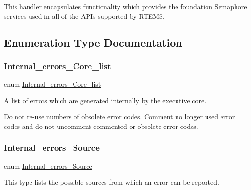 This handler encapsulates functionality which provides the foundation Semaphore services used in all of the A\+P\+Is supported by R\+T\+E\+MS. 

\subsection{Enumeration Type Documentation}
\mbox{\label{group__RTEMSScoreIntErr_ga55d1197d1b88e797ec344be41aa4f5fe}} 
\subsubsection{\texorpdfstring{Internal\_errors\_Core\_list}{Internal\_errors\_Core\_list}}
{\footnotesize\ttfamily enum \mbox{\hyperlink{group__RTEMSScoreIntErr_ga55d1197d1b88e797ec344be41aa4f5fe}{Internal\+\_\+errors\+\_\+\+Core\+\_\+list}}}



A list of errors which are generated internally by the executive core. 

Do not re-\/use numbers of obsolete error codes. Comment no longer used error codes and do not uncomment commented or obsolete error codes. \mbox{\label{group__RTEMSScoreIntErr_ga878b4de77df7d0b83d19609d4de42c26}} 
\subsubsection{\texorpdfstring{Internal\_errors\_Source}{Internal\_errors\_Source}}
{\footnotesize\ttfamily enum \mbox{\hyperlink{group__RTEMSScoreIntErr_ga878b4de77df7d0b83d19609d4de42c26}{Internal\+\_\+errors\+\_\+\+Source}}}



This type lists the possible sources from which an error can be reported. 

